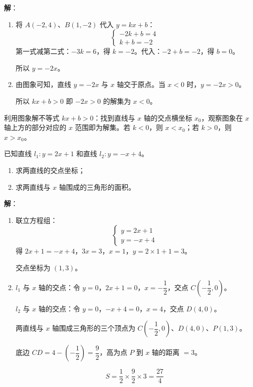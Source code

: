 \documentclass[12pt, a4paper]{ctexart}
\begin{document}
\textbf{解}：

\begin{enumerate}[leftmargin=2em]
  \item 将 $A(-2,4)$、$B(1,-2)$ 代入 $y = kx + b$：
  $$\begin{cases} -2k + b = 4 \\ k + b = -2 \end{cases}$$
  第一式减第二式：$-3k = 6$，得 $k = -2$。代入：$-2 + b = -2$，得 $b = 0$。

  所以 $y = -2x$。

  \item 由图象可知，直线 $y = -2x$ 与 $x$ 轴交于原点。当 $x < 0$ 时，$y = -2x > 0$。

  所以 $kx + b > 0$ 即 $-2x > 0$ 的解集为 $x < 0$。
\end{enumerate}

\begin{tipbox}[方法总结]
利用图象解不等式 $kx+b > 0$：找到直线与 $x$ 轴的交点横坐标 $x_0$，观察图象在 $x$ 轴上方的部分对应的 $x$ 范围即为解集。若 $k<0$，则 $x < x_0$；若 $k>0$，则 $x > x_0$。
\end{tipbox}

\begin{examplebox}[【例题6】两直线交点与几何面积综合]
已知直线 $l_1: y = 2x + 1$ 和直线 $l_2: y = -x + 4$。

\begin{enumerate}[leftmargin=2em]
  \item 求两直线的交点坐标；
  \item 求两直线与 $x$ 轴围成的三角形的面积。
\end{enumerate}
\end{examplebox}

\textbf{解}：

\begin{enumerate}[leftmargin=2em]
  \item 联立方程组：
  $$\begin{cases} y = 2x + 1 \\ y = -x + 4 \end{cases}$$
  得 $2x + 1 = -x + 4$，$3x = 3$，$x = 1$，$y = 2 \times 1 + 1 = 3$。

  交点坐标为 $(1, 3)$。

  \item $l_1$ 与 $x$ 轴的交点：令 $y = 0$，$2x + 1 = 0$，$x = -\dfrac{1}{2}$，交点 $C\left(-\dfrac{1}{2}, 0\right)$。

  $l_2$ 与 $x$ 轴的交点：令 $y = 0$，$-x + 4 = 0$，$x = 4$，交点 $D(4, 0)$。

  两直线与 $x$ 轴围成三角形的三个顶点为 $C\left(-\dfrac{1}{2}, 0\right)$、$D(4, 0)$、$P(1, 3)$。

  底边 $CD = 4 - \left(-\dfrac{1}{2}\right) = \dfrac{9}{2}$，高为点 $P$ 到 $x$ 轴的距离 $= 3$。

  $$S = \frac{1}{2} \times \frac{9}{2} \times 3 = \frac{27}{4}$$
\end{enumerate}
\end{document}
